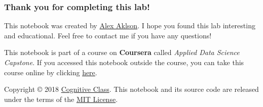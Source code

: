 \documentclass[11pt]{article}
\begin{document}
    \subsubsection{Thank you for completing this
lab!}\label{thank-you-for-completing-this-lab}

This notebook was created by
\href{https://www.linkedin.com/in/aklson/}{Alex Aklson}. I hope you
found this lab interesting and educational. Feel free to contact me if
you have any questions!

    This notebook is part of a course on \textbf{Coursera} called
\emph{Applied Data Science Capstone}. If you accessed this notebook
outside the course, you can take this course online by clicking
\href{http://cocl.us/DP0701EN_Coursera_Week3_LAB2}{here}.

    Copyright © 2018
\href{https://cognitiveclass.ai/?utm_source=bducopyrightlink\&utm_medium=dswb\&utm_campaign=bdu}{Cognitive
Class}. This notebook and its source code are released under the terms
of the \href{https://bigdatauniversity.com/mit-license/}{MIT License}.


    
    
    
    
\end{document}
